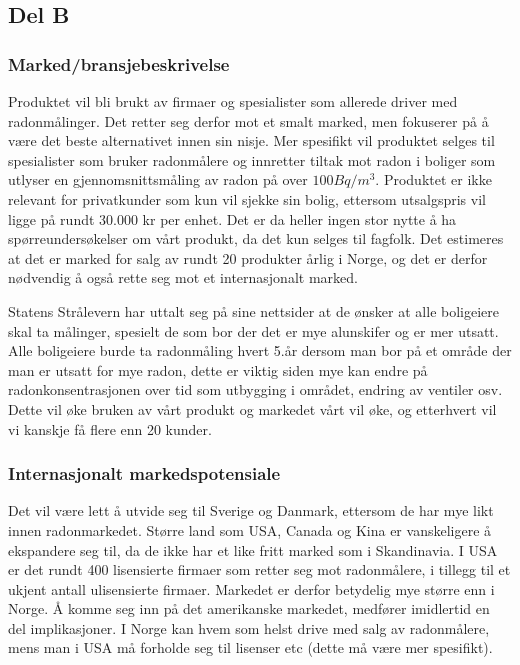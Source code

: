 \subsection{Del B}

\subsubsection{Marked/bransjebeskrivelse}

Produktet vil bli brukt av firmaer og spesialister som allerede driver med radonmålinger. Det retter seg derfor mot et smalt marked, men fokuserer på å være det beste alternativet innen sin nisje. Mer spesifikt vil produktet selges til spesialister som bruker radonmålere og innretter tiltak mot radon i boliger som utlyser en gjennomsnittsmåling av radon på over $100 Bq/m^3$. Produktet er ikke relevant for privatkunder som kun vil sjekke sin bolig, ettersom utsalgspris vil ligge på rundt 30.000 kr per enhet. Det er da heller ingen stor nytte å ha spørreundersøkelser om vårt produkt, da det kun selges til fagfolk. Det estimeres at det er marked for salg av rundt 20 produkter årlig i Norge, og det er derfor nødvendig å også rette seg mot et internasjonalt marked.

Statens Strålevern har uttalt seg på sine nettsider at de ønsker at alle boligeiere skal ta målinger, 
spesielt de som bor der det er mye alunskifer og er mer utsatt. Alle boligeiere burde ta radonmåling hvert 
5.år dersom man bor på et område der man er utsatt for mye radon, dette er viktig siden mye kan endre på 
radonkonsentrasjonen over tid som utbygging i området, endring av ventiler osv. Dette vil øke bruken av 
vårt produkt og markedet vårt vil øke, og etterhvert vil vi kanskje få flere enn 20 kunder. 

\subsubsection{Internasjonalt markedspotensiale}
Det vil være lett å utvide seg til Sverige og Danmark, ettersom de har mye likt innen radonmarkedet. Større land som USA, Canada og Kina er vanskeligere å ekspandere seg til, da de ikke har et like fritt marked som i Skandinavia. I USA er det rundt 400 lisensierte firmaer som retter seg mot radonmålere, i tillegg til et ukjent antall ulisensierte firmaer. Markedet er derfor betydelig mye større enn i Norge. Å komme seg inn på det amerikanske markedet, medfører imidlertid en del implikasjoner. I Norge kan hvem som helst drive med salg av radonmålere, mens man i USA må forholde seg til lisenser etc (dette må være mer spesifikt).

